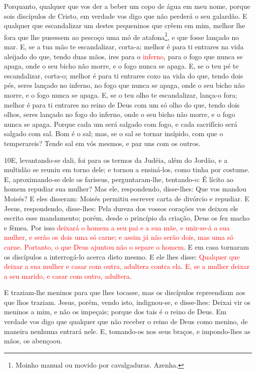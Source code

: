 Porquanto, qualquer que vos der a beber um copo de água em meu
nome, porque sois discípulos de Cristo, em verdade vos digo que não
perderá o seu galardão. E qualquer que escandalizar um destes
pequeninos que crêem em mim, melhor lhe fora que lhe pusessem ao
pescoço uma mó de atafona\footnote{Moinho manual ou movido por
cavalgaduras. Azenha.}, e que fosse lançado no mar. E, se a
tua mão te escandalizar, corta-a; melhor é para ti entrares na vida
aleijado do que, tendo duas mãos, ires para o \textcolor{red}{inferno}, para
o fogo que nunca se apaga, onde o seu bicho não morre, e o
fogo nunca se apaga. E, se o teu pé te escandalizar, corta-o;
melhor é para ti entrares coxo na vida do que, tendo dois pés, seres
lançado no inferno, no fogo que nunca se apaga, onde o seu
bicho não morre, e o fogo nunca se apaga. E, se o teu olho te
escandalizar, lança-o fora; melhor é para ti entrares no reino de
Deus com um só olho do que, tendo dois olhos, seres lançado no fogo
do inferno, onde o seu bicho não morre, e o fogo nunca se
apaga. Porque cada um será salgado com fogo, e cada
sacrifício será salgado com sal. Bom é o sal; mas, se o sal
se tornar insípido, com que o temperareis? Tende sal em vós mesmos,
e paz uns com os outros.

\medskip

\lettrine{10} E, levantando-se dali, foi para os termos da
Judéia, além do Jordão, e a multidão se reuniu em torno dele; e
tornou a ensiná-los, como tinha por costume. E, aproximando-se
dele os fariseus, perguntaram-lhe, tentando-o: É lícito ao homem
repudiar sua mulher? Mas ele, respondendo, disse-lhes: Que vos
mandou Moisés? E eles disseram: Moisés permitiu escrever carta
de divórcio e repudiar. E Jesus, respondendo, disse-lhes: Pela
dureza dos vossos corações vos deixou ele escrito esse mandamento;
porém, desde o princípio da criação, Deus os fez macho e fêmea.
Por isso \textcolor{red}{deixará o homem a seu pai e a sua mãe, e
unir-se-á a sua mulher}, \textcolor{red}{e serão os dois uma só carne; e
assim já não serão dois, mas uma só carne}. \textcolor{red}{Portanto, o
que Deus ajuntou não o separe o homem}. E em casa tornaram os
discípulos a interrogá-lo acerca disto mesmo. E ele lhes
disse: \textcolor{red}{Qualquer que deixar a sua mulher e casar com outra,
adultera contra ela}. \textcolor{red}{E, se a mulher deixar a seu
marido, e casar com outro, adultera}.

E traziam-lhe meninos para que lhes tocasse, mas os discípulos
repreendiam aos que lhos traziam. Jesus, porém, vendo isto,
indignou-se, e disse-lhes: Deixai vir os meninos a mim, e não os
impeçais; porque dos tais é o reino de Deus. Em verdade vos
digo que qualquer que não receber o reino de Deus como menino, de
maneira nenhuma entrará nele. E, tomando-os nos seus braços,
e impondo-lhes as mãos, os abençoou.

